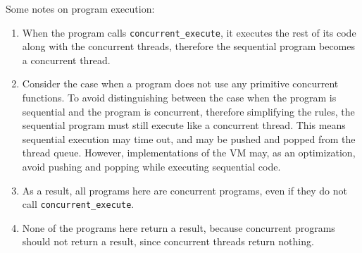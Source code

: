 Some notes on program execution:
\begin{enumerate}
\item When the program calls \texttt{concurrent\_execute}, it executes the rest of its code along with the concurrent threads, therefore the sequential program becomes a concurrent thread.
\item Consider the case when a program does not use any primitive concurrent functions. To avoid distinguishing between the case when the program is sequential and the program is concurrent, therefore simplifying the rules, the sequential program must still execute like a concurrent thread. This means sequential execution may time out, and may be pushed and popped from the thread queue. However, implementations of the VM may, as an optimization, avoid pushing and popping while executing sequential code.
\item As a result, all programs here are concurrent programs, even if they do not call \texttt{concurrent\_execute}.
\item None of the programs here return a result, because concurrent programs should not return a result, since concurrent threads return nothing.
\end{enumerate}

